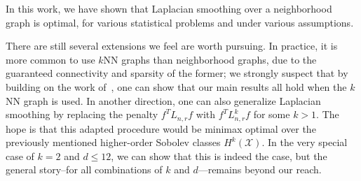 \documentclass[twoside]{article}
\newcommand{\1}{\mathbf{1}}
\newcommand{\Lap}{L}
\newcommand{\Xset}{\mathcal{X}}
\theoremstyle{definition}
\theoremstyle{remark}
\begin{document}
In this work, we have shown that Laplacian smoothing over a neighborhood graph is optimal, for various statistical problems and under various assumptions. 

There are still several extensions we feel are worth pursuing. In practice, it is more common to use $k$NN graphs than neighborhood graphs, due to the guaranteed connectivity and sparsity of the former; we strongly suspect that by building on the work of~\cite{calder2019}, one can show that our main results all hold when the $k$NN graph is used. In another direction, one can also generalize Laplacian smoothing by replacing the penalty $f^T \Lap_{n,r} f$ with $f^T \Lap_{n,r}^k f$ for some $k > 1$. The hope is that this adapted procedure would be minimax optimal over the previously mentioned higher-order Sobolev classes $H^k(\Xset)$. In the very special case of $k = 2$ and $d \leq 1 2$, we can show that this is indeed the case, but the general story--for all combinations of $k$ and $d$---remains beyond our reach. 


 
\end{document}
